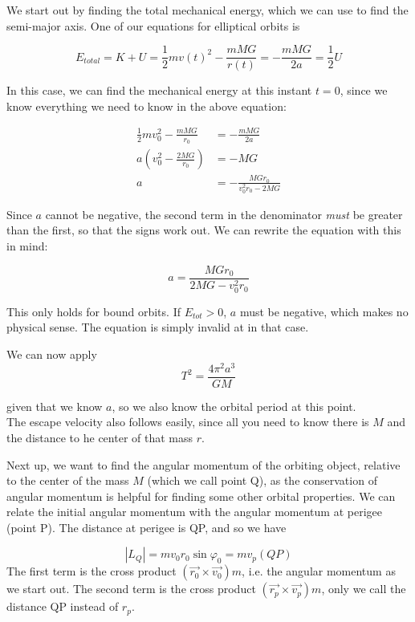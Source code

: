 We start out by finding the total mechanical energy, which we can use to find the semi-major axis. One of our equations for elliptical orbits is

\begin{equation}
E_{total} = K + U = \frac{1}{2} m v(t)^2 - \frac{m M G}{r(t)} = - \frac{m M G}{2a} = \frac{1}{2} U
\end{equation}

In this case, we can find the mechanical energy at this instant $t = 0$, since we know everything we need to know in the above equation:

\begin{align}
\frac{1}{2} m v_0^2 - \frac{m M G}{r_0} &= -\frac{m M G}{2a}\\
a \left(v_0^2 - \frac{2 M G}{r_0}\right) &= -M G\\
a &= -\frac{M G r_0}{v_0^2 r_0 - 2 M G}
\end{align}

Since $a$ cannot be negative, the second term in the denominator \emph{must} be greater than the first, so that the signs work out. We can rewrite the equation with this in mind:

\begin{equation}
a = \frac{M G r_0}{2 M G - v_0^2 r_0}
\end{equation}

This only holds for bound orbits. If $E_{tot} > 0$, $a$ must be negative, which makes no physical sense. The equation is simply invalid at in that case.

We can now apply
\begin{equation}
T^2 = \frac{4 \pi^2 a^3}{G M}
\end{equation}

given that we know $a$, so we also know the orbital period at this point.\\
The escape velocity also follows easily, since all you need to know there is $M$ and the distance to he center of that mass $r$.

Next up, we want to find the angular momentum of the orbiting object, relative to the center of the mass $M$ (which we call point Q), as the conservation of angular momentum is helpful for finding some other orbital properties. We can relate the initial angular momentum with the angular momentum at perigee (point P). The distance at perigee is QP, and so we have

\begin{equation}
|L_Q| = m v_0 r_0 \sin \varphi_0 = m v_p (QP)
\end{equation}
The first term is the cross product $(\vec{r_0} \times \vec {v_0}) m$, i.e. the angular momentum as we start out. The second term is the cross product $(\vec{r_p} \times \vec{v_p}) m$, only we call the distance QP instead of $r_p$.

